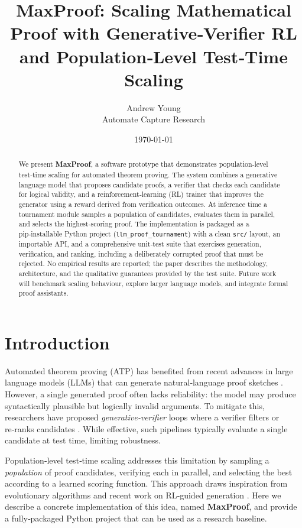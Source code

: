 \documentclass[11pt,a4paper]{article}
\title{MaxProof: Scaling Mathematical Proof with Generative‑Verifier RL and Population‑Level Test‑Time Scaling}
\author{Andrew Young \\ Automate Capture Research}
\date{\today}
\begin{document}
\maketitle

\begin{abstract}
We present \textbf{MaxProof}, a software prototype that demonstrates population‑level test‑time scaling for automated theorem proving.  The system combines a generative language model that proposes candidate proofs, a verifier that checks each candidate for logical validity, and a reinforcement‑learning (RL) trainer that improves the generator using a reward derived from verification outcomes.  At inference time a tournament module samples a population of candidates, evaluates them in parallel, and selects the highest‑scoring proof.  The implementation is packaged as a pip‑installable Python project (\texttt{llm\_proof\_tournament}) with a clean \texttt{src/} layout, an importable API, and a comprehensive unit‑test suite that exercises generation, verification, and ranking, including a deliberately corrupted proof that must be rejected.  No empirical results are reported; the paper describes the methodology, architecture, and the qualitative guarantees provided by the test suite.  Future work will benchmark scaling behaviour, explore larger language models, and integrate formal proof assistants.
\end{abstract}

\section{Introduction}
Automated theorem proving (ATP) has benefited from recent advances in large language models (LLMs) that can generate natural‑language proof sketches \citep{chen2023gpt}.  However, a single generated proof often lacks reliability: the model may produce syntactically plausible but logically invalid arguments.  To mitigate this, researchers have proposed \emph{generative‑verifier} loops where a verifier filters or re‑ranks candidates \citep{lee2022verifier}.  While effective, such pipelines typically evaluate a single candidate at test time, limiting robustness.

Population‑level test‑time scaling addresses this limitation by sampling a \emph{population} of proof candidates, verifying each in parallel, and selecting the best according to a learned scoring function.  This approach draws inspiration from evolutionary algorithms \citep{holland1992adaptation} and recent work on RL‑guided generation \citep{ouyang2022training}.  Here we describe a concrete implementation of this idea, named \textbf{MaxProof}, and provide a fully‑packaged Python project that can be used as a research baseline.
\end{document}
